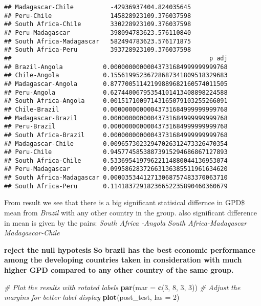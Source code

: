 \documentclass[
]{article}
\newenvironment{Shaded}{\begin{snugshade}}{\end{snugshade}}
\newcommand{\AttributeTok}[1]{\textcolor[rgb]{0.13,0.29,0.53}{#1}}
\newcommand{\CommentTok}[1]{\textcolor[rgb]{0.56,0.35,0.01}{\textit{#1}}}
\newcommand{\DecValTok}[1]{\textcolor[rgb]{0.00,0.00,0.81}{#1}}
\newcommand{\FunctionTok}[1]{\textcolor[rgb]{0.13,0.29,0.53}{\textbf{#1}}}
\newcommand{\NormalTok}[1]{#1}
\begin{document}
\begin{verbatim}
## Madagascar-Chile          -42936937404.824035645
## Peru-Chile                145828923109.376037598
## South Africa-Chile        330228923109.376037598
## Peru-Madagascar           398094783623.576110840
## South Africa-Madagascar   582494783623.576171875
## South Africa-Peru         393728923109.376037598
##                                                      p adj
## Brazil-Angola           0.00000000000043731684999999999768
## Chile-Angola            0.15561995236728687341809518329683
## Madagascar-Angola       0.87770051142199889682160574011505
## Peru-Angola             0.62744006795354101413408898224588
## South Africa-Angola     0.00151710097143165079103255266091
## Chile-Brazil            0.00000000000043731684999999999768
## Madagascar-Brazil       0.00000000000043731684999999999768
## Peru-Brazil             0.00000000000043731684999999999768
## South Africa-Brazil     0.00000000000043731684999999999768
## Madagascar-Chile        0.00965730232947026312473326470354
## Peru-Chile              0.94577458538873915294686867127893
## South Africa-Chile      0.53369541979622114880044136953074
## Peru-Madagascar         0.09958628372663136385511961634620
## South Africa-Madagascar 0.00003534412713068757483370063710
## South Africa-Peru       0.11418372918236652235890460360679
\end{verbatim}

From result we see that there is a big significant statisical differnce
in GPD\$ mean from \emph{Brazil} with any other country in the group.
also significant difference in mean is given by the pairs: \emph{South
Africa -Angola} \emph{South Africa-Madagascar} \emph{Madagascar-Chile}

\textbf{reject the null hypotesis} \textbf{So brazil has the best
economic performance among the developing countries taken in
consideration with much higher GPD compared to any other country of the
same group.}

\begin{Shaded}
\begin{Highlighting}[]
\CommentTok{\# Plot the results with rotated labels}
\FunctionTok{par}\NormalTok{(}\AttributeTok{mar =} \FunctionTok{c}\NormalTok{(}\DecValTok{3}\NormalTok{, }\DecValTok{8}\NormalTok{, }\DecValTok{3}\NormalTok{, }\DecValTok{3}\NormalTok{))  }\CommentTok{\# Adjust the margins for better label display}
\FunctionTok{plot}\NormalTok{(post\_test, }\AttributeTok{las =} \DecValTok{2}\NormalTok{)}
\end{Highlighting}
\end{Shaded}
\end{document}
